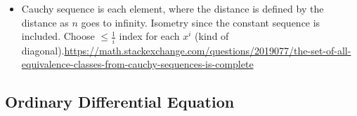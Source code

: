 \documentclass{article}
\newtheorem{theorem}{Theorem}
\theoremstyle{remark}
\begin{document}
\begin{itemize}
\subsection*{Completing the space}
\begin{theorem}
    Every metric space has a completion.
    \url{https://en.wikipedia.org/wiki/Complete_metric_space}
\end{theorem}
    \item Cauchy sequence is each element, where the distance is defined by the distance as $n$ goes to infinity. Isometry since the constant sequence is included. Choose $\leq\frac 1i$ index for each $x^i$ (kind of diagonal).\url{https://math.stackexchange.com/questions/2019077/the-set-of-all-equivalence-classes-from-cauchy-sequences-is-complete}
\end{itemize}
\subsection*{Ordinary Differential Equation}
\end{document}
